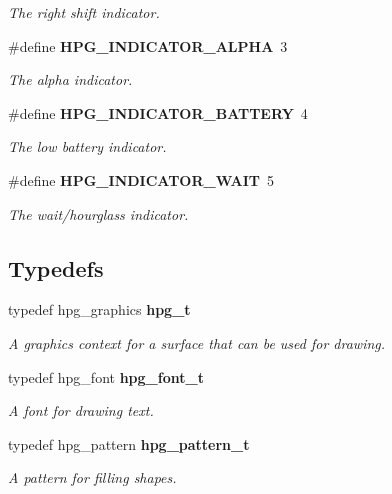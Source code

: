 \begin{CompactItemize}
\begin{CompactList}\small\item\em The right shift indicator.\item\end{CompactList}\item 
{}
\#define {\bf HPG\_\-INDICATOR\_\-ALPHA}\ 3\label{hpgraphics_8h_a21}

\begin{CompactList}\small\item\em The alpha indicator.\item\end{CompactList}\item 
{}
\#define {\bf HPG\_\-INDICATOR\_\-BATTERY}\ 4\label{hpgraphics_8h_a22}

\begin{CompactList}\small\item\em The low battery indicator.\item\end{CompactList}\item 
{}
\#define {\bf HPG\_\-INDICATOR\_\-WAIT}\ 5\label{hpgraphics_8h_a23}

\begin{CompactList}\small\item\em The wait/hourglass indicator.\item\end{CompactList}\end{CompactItemize}
\subsection*{Typedefs}
\begin{CompactItemize}
\item 
typedef hpg\_\-graphics {\bf hpg\_\-t}
\begin{CompactList}\small\item\em A graphics context for a surface that can be used for drawing.\item\end{CompactList}\item 
typedef hpg\_\-font {\bf hpg\_\-font\_\-t}
\begin{CompactList}\small\item\em A font for drawing text.\item\end{CompactList}\item 
typedef hpg\_\-pattern {\bf hpg\_\-pattern\_\-t}
\begin{CompactList}\small\item\em A pattern for filling shapes.\item\end{CompactList}\end{CompactItemize}
